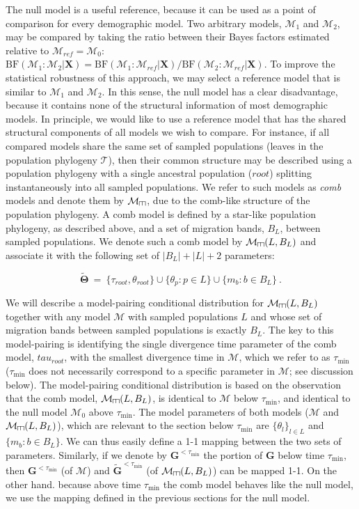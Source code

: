 \documentclass[11pt]{article}
\newcommand{\vect}[1]{\boldsymbol{\mathbf{#1}}}
\newcommand{\X}{\vect{X}}
\newcommand{\M}{\mathcal{M}}
\newcommand{\Tr}{\mathcal{T}}
\newcommand{\G}{\vect{G}}
\newcommand{\T}{\vect{\Theta}}
\newcommand{\Mref}{\M_{ref}}
\newcommand{\rbf}{\text{BF}}
\newcommand{\Gref}{\widetilde{\G}}
\newcommand{\Tref}{\widetilde{\T}}
\def\comb{\rotatebox[origin=c]{90}{$\exists$}}
\newcommand{\Mcomb}{\M_{\comb}}
\newcommand{\tmin}{\tau_{\text{min}}}
\begin{document}
The null model is a useful reference, because it can be used as a point of comparison for every demographic model.
%
Two arbitrary models, $\M_1$ and $\M_2$, may be compared by taking the ratio between their Bayes factors estimated relative to $\Mref=\M_0$:
$\rbf(\M_1:\M_2|\X) = \rbf(\M_1:\Mref|\X) / \rbf(\M_2:\Mref|\X)$.
%
To improve the statistical robustness of this approach, we may select a reference model that is similar to $\M_1$ and $\M_2$.
%
In this sense, the null model has a clear disadvantage, because it contains none of the structural information of most demographic models.
%
In principle, we would like to use a reference model that has the shared structural components of all models we wish to compare.
%
For instance, if all compared models share the same set of sampled populations (leaves in the population phylogeny $\Tr$),
then their common structure may be described using a population phylogeny with a single ancestral population ($root$) splitting instantaneously
into all sampled populations.
%
We refer to such models as {\em comb} models and denote them by $\Mcomb$,  due to the comb-like structure of the population phylogeny.
%
A comb model is defined by a star-like population phylogeny, as described above, and a set of  migration bands, $B_L$,
between sampled populations.
%
We denote such a comb model by $\Mcomb(L,B_L)$ and associate it with the following set of $|B_L|+|L|+2$ parameters:
%
%
\begin{small}
\begin{equation*}
 \Tref ~=~ \{ \tau_{root},\theta_{root} \} \cup \{\theta_p:p\in L\}\cup \{m_b:b\in B_L\} ~.
\end{equation*}
\end{small}
%
%

We will describe a model-pairing conditional distribution for $\Mcomb(L,B_L)$ together with any model $\M$ with sampled populations
$L$ and whose set of migration bands between sampled populations is exactly $B_L$.
%
The key to this model-pairing is identifying the single divergence time parameter of the comb model, $tau_{root}$, with the
smallest divergence time in $\M$, which we refer to as $\tmin$ ($\tmin$ does not necessarily correspond to a specific parameter in $\M$; see discussion below).
%
The model-pairing conditional distribution is based on the observation that the comb model, $\Mcomb(L,B_L)$, is identical to $\M$ below $\tmin$, and identical
to the null model $\M_0$ above $\tmin$.
%
The model parameters of both models ($\M$ and $\Mcomb(L,B_L)$), which are relevant to the section below $\tmin$ are $\{\theta_l\}_{l\in L}$ and $\{m_b:b\in B_L\}$.
%
We can thus easily define a 1-1 mapping between the two sets of parameters.
%
Similarly, if we denote by $\G^{<\tmin}$ the portion of $\G$ below time $\tmin$, then $\G^{<\tmin}$ (of $\M$) and $\Gref^{<\tmin}$ (of $\Mcomb(L,B_L)$)
can be mapped 1-1.
%
On the other hand. because above time $\tmin$ the comb model behaves like the null model, we use the mapping defined in the previous sections for the null model.
\end{document}
